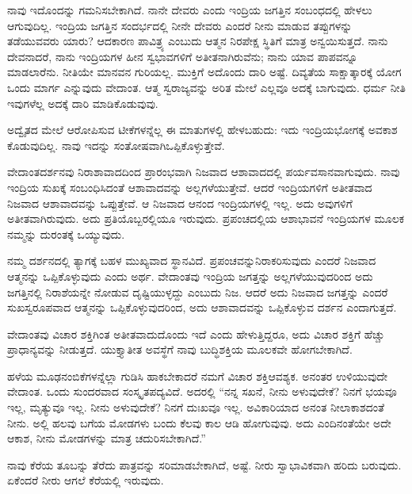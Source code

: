 \vskip 6pt

ನಾವು ಇದೊಂದನ್ನು ಗಮನಿಸಬೇಕಾಗಿದೆ. ನಾನೇ ದೇವರು ಎಂದು ಇಂದ್ರಿಯ ಜಗತ್ತಿನ ಸಂಬಂಧದಲ್ಲಿ ಹೇಳಲು ಆಗುವುದಿಲ್ಲ. ಇಂದ್ರಿಯ ಜಗತ್ತಿನ ಸಂದರ್ಭದಲ್ಲಿ ನೀನೇ ದೇವರು ಎಂದರೆ ನೀನು ಮಾಡುವ ತಪ್ಪುಗಳನ್ನು ತಡೆಯುವವರು ಯಾರು? ಆದಕಾರಣ ಪಾವಿತ್ರ್ಯ ಎಂಬುದು ಆತ್ಮನ ನಿರಪೇಕ್ಷ ಸ್ಥಿತಿಗೆ ಮಾತ್ರ ಅನ್ವಯಿಸುತ್ತದೆ. ನಾನು ದೇವನಾದರೆ, ನಾನು ಇಂದ್ರಿಯಗಳ ಹೀನ ಸ್ವಭಾವಗಳಿಗೆ ಅತೀತನಾಗಿರುವೆನು; ನಾನು ಯಾವ ಪಾಪವನ್ನೂ ಮಾಡಲಾರೆನು. ನೀತಿಯೇ ಮಾನವನ ಗುರಿಯಲ್ಲ. ಮುಕ್ತಿಗೆ ಅದೊಂದು ದಾರಿ ಅಷ್ಟೆ. ದಿವ್ಯತೆಯ ಸಾಕ್ಷಾತ್ಕಾರಕ್ಕೆ ಯೋಗ ಒಂದು ಮಾರ್ಗ ಎನ್ನುವುದು ವೇದಾಂತ. ಆತ್ಮ ಸ್ವರಾಜ್ಯವನ್ನು ಅರಿತ ಮೇಲೆ ಎಲ್ಲವೂ ಅದಕ್ಕೆ ಬಾಗುವುದು. ಧರ್ಮ ನೀತಿ ಇವುಗಳೆಲ್ಲ ಅದಕ್ಕೆ ದಾರಿ ಮಾಡಿಕೊಡುವುವು.

\vskip 6pt

ಅದ್ವೈತದ ಮೇಲೆ ಆರೋಪಿಸುವ ಟೀಕೆಗಳನ್ನೆಲ್ಲ ಈ ಮಾತುಗಳಲ್ಲಿ ಹೇಳಬಹುದು: ಇದು ಇಂದ್ರಿಯಭೋಗಕ್ಕೆ ಅವಕಾಶ ಕೊಡುವುದಿಲ್ಲ. ನಾವು ಇದನ್ನು ಸಂತೋಷವಾಗಿ\break ಒಪ್ಪಿಕೊಳ್ಳುತ್ತೇವೆ.

\vskip 6pt

ವೇದಾಂತದರ್ಶನವು ನಿರಾಶಾವಾದದಿಂದ ಪ್ರಾರಂಭವಾಗಿ ನಿಜವಾದ ಆಶಾವಾದದಲ್ಲಿ ಪರ್ಯವಸಾನವಾಗುವುದು. ನಾವು ಇಂದ್ರಿಯ ಸುಖಕ್ಕೆ ಸಂಬಂಧಿಸಿದಂತೆ ಆಶಾವಾದವನ್ನು ಅಲ್ಲಗಳೆಯುತ್ತೇವೆ. ಆದರೆ ಇಂದ್ರಿಯಗಳಿಗೆ ಅತೀತವಾದ ನಿಜವಾದ ಆಶಾವಾದವನ್ನು ಒಪ್ಪುತ್ತೇವೆ. ಆ ನಿಜವಾದ ಆನಂದ ಇಂದ್ರಿಯಗಳಲ್ಲಿ ಇಲ್ಲ. ಅದು ಅವುಗಳಿಗೆ ಅತೀತವಾಗಿರುವುದು. ಅದು ಪ್ರತಿಯೊಬ್ಬರಲ್ಲಿಯೂ ಇರುವುದು. ಪ್ರಪಂಚದಲ್ಲಿಯ ಆಶಾಭಾವನೆ ಇಂದ್ರಿಯಗಳ ಮೂಲಕ ನಮ್ಮನ್ನು ದುರಂತಕ್ಕೆ ಒಯ್ಯುವುದು.

\vskip 6pt

ನಮ್ಮ ದರ್ಶನದಲ್ಲಿ ತ್ಯಾಗಕ್ಕೆ ಬಹಳ ಮುಖ್ಯವಾದ ಸ್ಥಾನವಿದೆ. ಪ್ರಪಂಚವನ್ನು\break ನಿರಾಕರಿಸುವುದು ಎಂದರೆ ನಿಜವಾದ ಆತ್ಮನನ್ನು ಒಪ್ಪಿಕೊಳ್ಳುವುದು ಎಂದು ಅರ್ಥ. ವೇದಾಂತವು ಇಂದ್ರಿಯ ಜಗತ್ತನ್ನು ಅಲ್ಲಗಳೆಯುವುದರಿಂದ ಅದು ಜಗತ್ತಿನಲ್ಲಿ ನಿರಾಶೆಯನ್ನೇ ನೋಡುವ ದೃಷ್ಟಿಯುಳ್ಳದ್ದು ಎಂಬುದು ನಿಜ. ಆದರೆ ಅದು ನಿಜವಾದ ಜಗತ್ತನ್ನು ಎಂದರೆ ಸುಖಸ್ವರೂಪವಾದ ಆತ್ಮನನ್ನು ಒಪ್ಪಿಕೊಳ್ಳುವುದರಿಂದ, ಅದು ಆಶಾವಾದವನ್ನು ಒಪ್ಪಿಕೊಳ್ಳುವ ದರ್ಶನ ಎಂದಾಗುತ್ತದೆ.

\vskip 6pt

ವೇದಾಂತವು ವಿಚಾರ ಶಕ್ತಿಗಿಂತ ಅತೀತವಾದುದೊಂದು ಇದೆ ಎಂದು ಹೇಳುತ್ತಿದ್ದರೂ, ಅದು ವಿಚಾರ ಶಕ್ತಿಗೆ ಹೆಚ್ಚು ಪ್ರಾಧಾನ್ಯವನ್ನು ನೀಡುತ್ತದೆ. ಯುಕ್ತ್ಯಾತೀತ ಅವಸ್ಥೆಗೆ ನಾವು ಬುದ್ಧಿಶಕ್ತಿಯ ಮೂಲಕವೇ ಹೋಗಬೇಕಾಗಿದೆ.

\vskip 6pt

ಹಳೆಯ ಮೂಢನಂಬಿಕೆಗಳನ್ನೆಲ್ಲಾ ಗುಡಿಸಿ ಹಾಕಬೇಕಾದರೆ ನಮಗೆ ವಿಚಾರ ಶಕ್ತಿ\break ಆವಶ್ಯಕ. ಅನಂತರ ಉಳಿಯುವುದೇ ವೇದಾಂತ. ಒಂದು ಸುಂದರವಾದ ಸಂಸ್ಕೃತ\break ಪದ್ಯವಿದೆ. ಅದರಲ್ಲಿ “ನನ್ನ ಸಖನೆ, ನೀನು ಅಳುವುದೇಕೆ? ನಿನಗೆ ಭಯವೂ ಇಲ್ಲ, ಮೃತ್ಯುವೂ ಇಲ್ಲ. ನೀನು ಅಳುವುದೇಕೆ? ನಿನಗೆ ದುಃಖವೂ ಇಲ್ಲ. ಅವಿಕಾರಿಯಾದ ಅನಂತ ನೀಲಾಕಾಶದಂತೆ ನೀನು. ಅಲ್ಲಿ ಹಲವು ಬಗೆಯ ಮೋಡಗಳು ಬಂದು ಕೆಲವು ಕಾಲ ಆಡಿ ಹೋಗುವುವು. ಅದು ಎಂದಿನಂತೆಯೇ ಅದೇ ಆಕಾಶ, ನೀನು ಮೋಡಗಳನ್ನು ಮಾತ್ರ ಚದುರಿಸಬೇಕಾಗಿದೆ.”

ನಾವು ಕೆರೆಯ ತೂಬನ್ನು ತೆರೆದು ಪಾತ್ರವನ್ನು ಸರಿಮಾಡಬೇಕಾಗಿದೆ, ಅಷ್ಟೆ. ನೀರು ಸ್ವಾಭಾವಿಕವಾಗಿ ಹರಿದು ಬರುವುದು. ಏಕೆಂದರೆ ನೀರು ಆಗಲೆ ಕೆರೆಯಲ್ಲಿ ಇರುವುದು.

